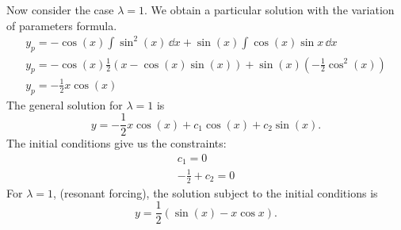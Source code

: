 {\begin{Solution}
\begin{enumerate}
    Now consider the case $\lambda = 1$.  
    We obtain a particular solution with the variation of parameters formula.
    \begin{gather*}
      y_p = - \cos(x) \int \sin^2(x) \,\dd x
      + \sin(x) \int \cos(x) \sin x \,\dd x \\
      y_p = - \cos(x) \frac{1}{2} (x - \cos(x) \sin(x) )
      + \sin(x) \left( - \frac{1}{2} \cos^2(x) \right) \\
      y_p = - \frac{1}{2} x \cos(x)
    \end{gather*}
    The general solution for $\lambda = 1$ is
    \[
    y = - \frac{1}{2} x \cos(x) + c_1 \cos(x) 
    + c_2 \sin(x).
    \]
    The initial conditions give us the constraints:
    \begin{gather*}
      c_1 = 0 \\
      - \frac{1}{2} + c_2 = 0
    \end{gather*}
    For $\lambda = 1$, (resonant forcing), the solution subject to the initial 
    conditions is
    \[
    \boxed{
      y = \frac{1}{2} (\sin(x) - x \cos x).
      }
    \]
  \end{enumerate}
\end{Solution}






}
